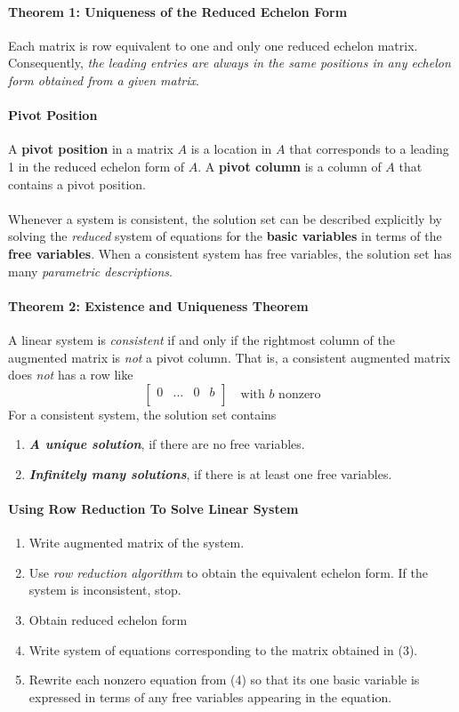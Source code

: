 \documentclass{article}
\begin{document}
	\paragraph{Theorem 1: Uniqueness of the Reduced Echelon Form} Each matrix is row equivalent to one and only one reduced echelon matrix. Consequently, \emph{the leading entries are always in the same positions in any echelon form obtained from a given matrix}.
	\paragraph{Pivot Position} A \textbf{pivot position} in a matrix $A$ is a location in $A$ that corresponds to a leading 1 in the reduced echelon form of $A$. A \textbf{pivot column} is a column of $A$ that contains a pivot position.
	\paragraph{} Whenever a system is consistent, the solution set can be described explicitly by solving the \emph{reduced} system of equations for the \textbf{basic variables} in terms of the \textbf{free variables}. When a consistent system has free variables, the solution set has many \emph{parametric descriptions}.
	\paragraph{Theorem 2: Existence and Uniqueness Theorem} A linear system is \emph{consistent} if and only if the rightmost column of the augmented matrix is \emph{not} a pivot column. That is, a consistent augmented matrix does \emph{not} has a row like
	\[
	\begin{bmatrix}
		0 & ... & 0 & b\\
	\end{bmatrix}
	 \quad \text{with $b$ nonzero}
	 \]
	 For a consistent system, the solution set contains
	 \begin{enumerate}
	 	\item \emph{\textbf{A unique solution}}, if there are no free variables.
	 	\item \emph{\textbf{Infinitely many solutions}}, if there is at least one free variables.
	 \end{enumerate}
	 \paragraph{Using Row Reduction To Solve Linear System}
	 \begin{enumerate}
	 	\item Write augmented matrix of the system.
	 	\item Use \emph{row reduction algorithm} to obtain the equivalent echelon form. If the system is inconsistent, stop.
	 	\item Obtain reduced echelon form
	 	\item Write system of equations corresponding to the matrix obtained in (3).
	 	\item Rewrite each nonzero equation from (4) so that its one basic variable is expressed in terms of any free variables appearing in the equation.
	 \end{enumerate}
\end{document}
